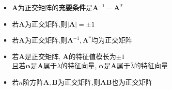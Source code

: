 \documentclass{article}
\begin{document}
\begin{itemize}
$$\begin{aligned}
\begin{array}{cccc}
							\vdots & \vdots & & \vdots \\
							\left(\boldsymbol{\alpha}_{n}, \boldsymbol{\alpha}_{1}\right) & \left(\boldsymbol{\alpha}_{n}, 	\boldsymbol{\alpha}_{2}\right) & \cdots & \left(\boldsymbol{\alpha}_{n}, \boldsymbol{\alpha}_{n}\right)
						\end{array}\right)
					\end{aligned}
					$$
					若$n$维欧氏空间$\boldsymbol V$的一组基 $\boldsymbol \varepsilon_{1}, \boldsymbol \varepsilon_{2}, \cdots$, $\boldsymbol \varepsilon_{n}$
					$$
					\boldsymbol A=\left(\begin{array}{cccc}
						\left(\boldsymbol \varepsilon_{1}, \boldsymbol \varepsilon_{1}\right) & \left(\boldsymbol \varepsilon_{1}, \boldsymbol \varepsilon_{2}\right) & \cdots & \left(\boldsymbol \varepsilon_{1}, \boldsymbol \varepsilon_{n}\right) \\
						\left(\boldsymbol \varepsilon_{2}, \boldsymbol \varepsilon_{1}\right) & \left(\boldsymbol \varepsilon_{2}, \boldsymbol \varepsilon_{2}\right) & \cdots & \left(\boldsymbol \varepsilon_{2}, \boldsymbol \varepsilon_{n}\right) \\
						\vdots & \vdots & & \vdots \\
						\left(\boldsymbol \varepsilon_{n}, \boldsymbol \varepsilon_{1}\right) & \left(\boldsymbol \varepsilon_{n}, \boldsymbol \varepsilon_{2}\right) & \cdots & \left(\boldsymbol \varepsilon_{n}, \boldsymbol \varepsilon_{n}\right)
					\end{array}\right)
					$$
					为基 $\boldsymbol \varepsilon_{1}, \boldsymbol \varepsilon_{2}, \cdots$, $\boldsymbol \varepsilon_{n}$ 的\textbf{度量矩阵}.度量矩阵为正定矩阵
					\item $\boldsymbol A$为正交矩阵的\textbf{充要条件}是$\boldsymbol A^{-1}=\boldsymbol A^T$
					\item 若$\boldsymbol A$为正交矩阵,则$|\boldsymbol A|=\pm 1$
					\item 若$\boldsymbol A$为正交矩阵,则$\boldsymbol A^{-1},\boldsymbol A^*$均为正交矩阵
					\item 若$\boldsymbol A$是正交矩阵, $\boldsymbol A$的特征值模长为$\pm1$\\且若$\boldsymbol\alpha$是$\boldsymbol A$属于$\lambda$的特征向量, $\boldsymbol{\overline{\alpha}}$是$\boldsymbol A$属于$\overline{\lambda}$的特征向量
					\item 若$n$阶方阵$\boldsymbol A,\boldsymbol B$为正交矩阵,则$\boldsymbol A\boldsymbol B$也为正交矩阵
				\end{itemize}
\end{document}
